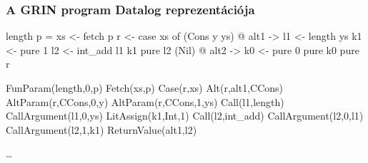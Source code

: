 \documentclass[bigger]{beamer}
\begin{document}
\begin{frame}[fragile]
\frametitle{A GRIN program Datalog reprezentációja}
\begin{center}
	\begin{minipage}{0.50\textwidth}
		\begin{haskellcode}
		length p =
		  xs <- fetch p
		  r <- case xs of
		    (Cons y ys) @ alt1 ->
		      l1 <- length ys
		      k1 <- pure 1
		      l2 <- int_add l1 k1
		      pure l2
		    (Nil) @ alt2 ->
		      k0 <- pure 0
		      pure k0
		  pure r
		\end{haskellcode}
	\end{minipage}
	\hfill 
	\pause
	\begin{minipage}{0.425\textwidth}
		\vspace{0.5cm}
		\begin{haskellcode}
        FunParam(length,0,p)
        Fetch(xs,p)
        Case(r,xs)
        Alt(r,alt1,CCons)
        AltParam(r,CCons,0,y)
        AltParam(r,CCons,1,ys)
        Call(l1,length)
        CallArgument(l1,0,ys)
        LitAssign(k1,Int,1)
        Call(l2,int_add)
        CallArgument(l2,0,l1)
        CallArgument(l2,1,k1)
        ReturnValue(alt1,l2)
		\end{haskellcode}
		\dots
	\end{minipage}
\end{center}
\end{frame}
\end{document}
